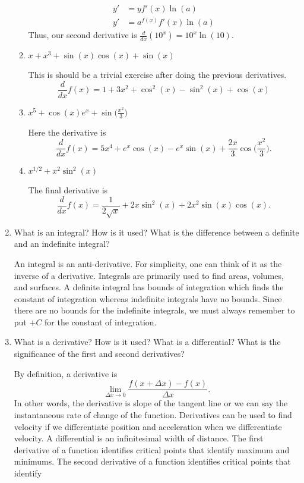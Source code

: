 \begin{enumerate}
\begin{enumerate}[label = (\alph*)]
\begin{align*}
      y' &= yf'(x)\ln(a)\\
      y' &= a^{f(x)}f'(x)\ln(a)
    \end{align*}
    Thus, our second derivative is \(\frac{d}{dx}(10^x) = 10^x\ln(10)\).
  \item
    \(x + x^3 + \sin(x)\cos(x) + \sin(x)\)
    \par\smallskip
    This is should be a trivial exercise after doing the previous derivatives.
    \[
    \frac{d}{dx}f(x) = 1 + 3x^2 + \cos^2(x) - \sin^2(x) + \cos(x)
    \]
  \item
    \(x^5 + \cos(x)e^x + \sin\big(\frac{x^2}{3}\big)\)
    \par\smallskip
    Here the derivative is
    \[
    \frac{d}{dx}f(x) = 5x^4 + e^x\cos(x) - e^x\sin(x) +
    \frac{2x}{3}\cos\bigg(\frac{x^2}{3}\bigg).
    \]
  \item
    \(x^{1/2} + x^2\sin^2(x)\)
    \par\smallskip
    The final derivative is
    \[
    \frac{d}{dx}f(x) = \frac{1}{2\sqrt{x}} + 2x\sin^2(x) + 2x^2\sin(x)\cos(x).
    \]
  \end{enumerate}
\item
  What is an integral?
  How is it used?
  What is the difference between a definite and an indefinite integral?
  \par\smallskip
  An integral is an anti-derivative.
  For simplicity, one can think of it as the inverse of a derivative.
  Integrals are primarily used to find areas, volumes, and surfaces.
  A definite integral has bounds of integration which finds the constant of
  integration whereas indefinite integrals have no bounds.
  Since there are no bounds for the indefinite integrals, we must always
  remember to put \(+ C\) for the constant of integration.
\item
  What is a derivative?
  How is it used?
  What is a differential?
  What is the significance of the first and second derivatives?
  \par\smallskip
  By definition, a derivative is
  \[
  \lim_{\Delta x\to 0}\frac{f(x + \Delta x) - f(x)}{\Delta x}.
  \]
  In other words, the derivative is slope of the tangent line or we can say the
  instantaneous rate of change of the function.
  Derivatives can be used to find velocity if we differentiate position and
  acceleration when we differentiate velocity.
  A differential is an infinitesimal width of distance.
  The first derivative of a function identifies critical points that identify
  maximum and minimums.
  The second derivative of a function identifies critical points that identify

\end{enumerate}
